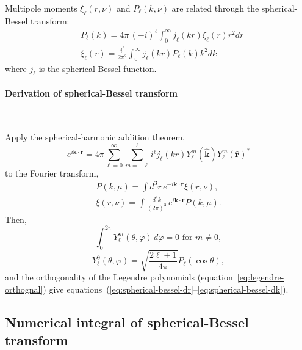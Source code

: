 \documentclass[a4paper,11pt, fleqn]{article}
\begin{document}
\vspace{5mm} Multipole moments $\xi_\ell(r, \nu)$ and $P_\ell(k, \nu)$
are related through the spherical-Bessel transform:
%
\begin{align}
  &P_\ell(k) = 4\pi \, (-i)^\ell \!\int_0^\infty \! j_\ell(kr) \xi_\ell(r) r^2 dr
  \label{eq:spherical-bessel-dr}\\
  &\xi_\ell(r) = \frac{i^\ell}{2\pi^2} \int_0^\infty \! j_\ell(kr) P_\ell(k) k^2 dk
  \label{eq:spherical-bessel-dk}
\end{align}
%
where $j_\ell$ is the spherical Bessel function.

\clearpage

\paragraph{Derivation of spherical-Bessel transform} \quad\\
\label{proof:multipole-transform}

\vspace{5mm}

Apply the spherical-harmonic addition theorem,
%
\begin{equation}
  e^{i\bm{k}\cdot\bm{r}} = 4\pi \sum_{\ell=0}^\infty \sum_{m=-\ell}^\ell
  i^\ell j_\ell(kr) Y_\ell^m(\hat{\bm{k}}) Y_\ell^m(\hat{\bm{r}})^*
\end{equation}
%
to the Fourier transform,
%
\begin{align}
  P(k, \mu) = \int \!\! d^3 r \, e^{-i\bm{k}\cdot\bm{r}} \xi(r, \nu),\\
  \xi(r, \nu) = \int \!\! \frac{d^3 k}{(2\pi)^3} \, e^{i\bm{k}\cdot\bm{r}} P(k, \mu).
\end{align}
%
Then,
%
\begin{equation}
  \int_0^{2\pi} \! Y_\ell^m(\theta, \varphi) \, d \varphi = 0
  \mbox{ for $m \neq 0$},
\end{equation}
%
\begin{equation}
  Y_\ell^0(\theta, \varphi) = \sqrt{\frac{2\ell + 1}{4\pi}} P_\ell(\cos\theta),
\end{equation}
%
and the orthogonality of the Legendre polynomials
(equation~\ref{eq:legendre-orthognal}) give
equations~(\ref{eq:spherical-bessel-dr}--\ref{eq:spherical-bessel-dk}).

\clearpage
\subsection{Numerical integral of spherical-Bessel transform}
\end{document}
